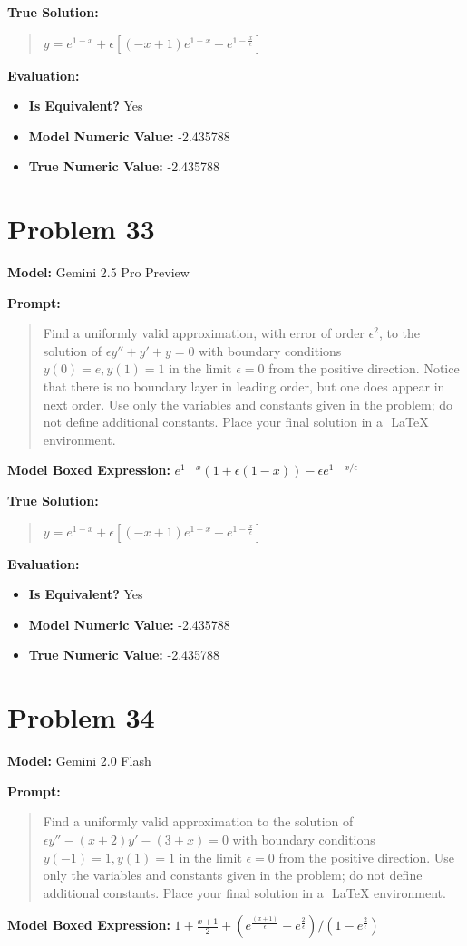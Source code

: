 \documentclass{article}
\begin{document}
\textbf{True Solution:}
\begin{quote}
$y = e^{1-x} + \epsilon[(-x+1)e^{1-x} -e^{1-\frac{x}{\epsilon}}]$
\end{quote}

\textbf{Evaluation:}
\begin{itemize}
\item \textbf{Is Equivalent?} Yes
\item \textbf{Model Numeric Value:} -2.435788
\item \textbf{True Numeric Value:} -2.435788
\end{itemize}
\vspace{1cm}
\section*{Problem 33}
\textbf{Model:} Gemini 2.5 Pro Preview

\textbf{Prompt:}
\begin{quote}
Find a uniformly valid approximation, with error of order $\epsilon^2$, to the solution of $\epsilon y'' + y' +y = 0$ with boundary conditions $y(0) = e, y(1) = 1$ in the limit $\epsilon = 0$ from the positive direction. Notice that there is no boundary layer in leading order, but one does appear in next order. Use only the variables and constants given in the problem; do not define additional constants. Place your final solution in a $\boxed{}$ LaTeX environment.
\end{quote}
\textbf{Model Boxed Expression:} $e^{1-x}(1+\epsilon(1-x)) - \epsilon e^{1-x/\epsilon}$

\textbf{True Solution:}
\begin{quote}
$y = e^{1-x} + \epsilon[(-x+1)e^{1-x} -e^{1-\frac{x}{\epsilon}}]$
\end{quote}

\textbf{Evaluation:}
\begin{itemize}
\item \textbf{Is Equivalent?} Yes
\item \textbf{Model Numeric Value:} -2.435788
\item \textbf{True Numeric Value:} -2.435788
\end{itemize}
\vspace{1cm}
\section*{Problem 34}
\textbf{Model:} Gemini 2.0 Flash

\textbf{Prompt:}
\begin{quote}
Find a uniformly valid approximation to the solution of $\epsilon y'' - (x+2)y' - (3+x) = 0$ with boundary conditions $y(-1) = 1, y(1) = 1$ in the limit $\epsilon = 0$ from the positive direction. Use only the variables and constants given in the problem; do not define additional constants. Place your final solution in a $\boxed{}$ LaTeX environment.
\end{quote}
\textbf{Model Boxed Expression:} $1 + \frac{x+1}{2} + (e^{\frac{(x+1)}{\epsilon}} - e^{\frac{2}{\epsilon}})/(1 - e^{\frac{2}{\epsilon}})$
\end{document}

